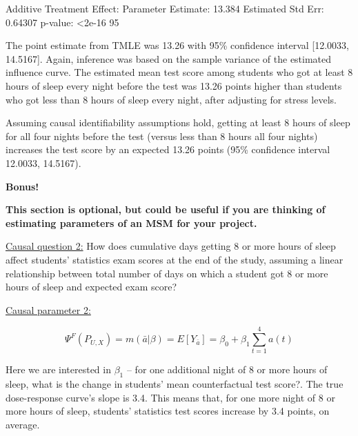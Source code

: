 \documentclass{exam}
\begin{document}
\begin{solution}
\begin{Schunk}
\begin{Soutput}
Additive Treatment Effect:
   Parameter Estimate:  13.384 
    Estimated Std Err:  0.64307 
              p-value:  <2e-16 
    95%
\end{Soutput}
\end{Schunk}

The point estimate from TMLE was 13.26 with 95\% confidence interval [12.0033, 14.5167]. Again, inference was based on the sample variance of the estimated influence curve. The estimated mean test score among students who got at least 8 hours of sleep every night before the test was 13.26 points higher than students who got less than 8 hours of sleep every night, after adjusting for stress levels.

Assuming causal identifiability assumptions hold, getting at least 8 hours of sleep for all four nights before the test (versus less than 8 hours all four nights) increases the test score by an expected 13.26 points (95\% confidence interval 12.0033, 14.5167).

\end{solution}



\noindent \Large{\textbf{Bonus!}}

\normalsize

\noindent \textbf{This section is optional, but could be useful if you are thinking of estimating parameters of an MSM for your project.}

\noindent \underline{Causal question 2:} How does cumulative days getting 8 or more hours of sleep affect students' statistics exam scores at the end of the study, assuming a linear relationship between total number of days on which a student got 8 or more hours of sleep and expected exam score? 



\noindent\underline{Causal parameter 2:}

\[
\Psi^F(P_{U,X}) = m(\bar{a}|\beta) = E[Y_{\bar{a}}] = \beta_0 + \beta_1 \sum_{t=1}^4a(t)
\]

Here we are interested in $\beta_1$ -- for one additional night of 8 or more hours of sleep, what is the change in students' mean counterfactual test score?. The true dose-response curve's slope is 3.4. This means that, for one more night of 8 or more hours of sleep, students' statistics test scores increase by 3.4 points, on average.
\end{document}
